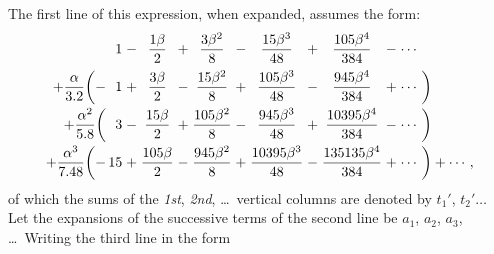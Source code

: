 \documentclass[11pt]{article}
\begin{document}
The first line of this expression, when expanded, assumes the form:
\[
\begin{array}{r@{\,}r@{\;}c@{\;}c@{\;}c@{\;}c@{\;}c@{\;}c@{\;}c@{\;}c@{\;}c@{\;}c@{\,}l}
 & 1 & - & \dfrac{1\beta}{2} & + & \dfrac{3\beta^{2}}{8} & - & \dfrac{15\beta^{3}}{48} & + & \dfrac{105\beta^{4}}{384} & - & \cdots & \\[3mm]
+\dfrac{\alpha}{3.2}\biggl(- & 1 & + & \dfrac{3\beta}{2} & - & \dfrac{15\beta^{2}}{8} & + & \dfrac{105\beta^{3}}{48} & - & \dfrac{945\beta^{4}}{384} & + & \cdots & \biggr)\\[3mm]
+\dfrac{\alpha^{2}}{5.8}\biggl( & 3 & - & \dfrac{15\beta}{2} & + & \dfrac{105\beta^{2}}{8} & - & \dfrac{945\beta^{3}}{48} & + & \dfrac{10395\beta^{4}}{384} & - & \cdots & \biggr)\\[3mm]
+\dfrac{\alpha^{3}}{7.48}\biggl(- & 15 & + & \dfrac{105\beta}{2} & - & \dfrac{945\beta^{2}}{8} & + & \dfrac{10395\beta^{3}}{48} & - & \dfrac{135135\beta^{4}}{384} & + & \cdots & \biggr)+\cdots,
\end{array}
\]
of which the sums of the \emph{1st}, \emph{2nd}, \dots\ vertical columns are denoted by $t_1'$, $t_2'\dots$ Let the expansions of the successive terms of the second line be $a_1$, $a_2$, $a_3$, \dots\ Writing the third line in the form
\end{document}
